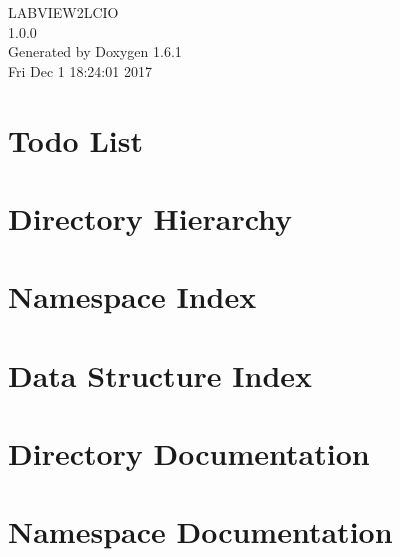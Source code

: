 \documentclass[a4paper]{book}
\begin{document}
\begin{titlepage}
\vspace*{7cm}
\begin{center}
{\Large LABVIEW2LCIO \\[1ex]\large 1.0.0 }\\
\vspace*{1cm}
{\large Generated by Doxygen 1.6.1}\\
\vspace*{0.5cm}
{\small Fri Dec 1 18:24:01 2017}\\
\end{center}
\end{titlepage}
\clearemptydoublepage
{}
\tableofcontents
\clearemptydoublepage
{}
\chapter{Todo List}
\label{todo}

\chapter{Directory Hierarchy}

\chapter{Namespace Index}

\chapter{Data Structure Index}

\chapter{Directory Documentation}




\chapter{Namespace Documentation}

\end{document}
